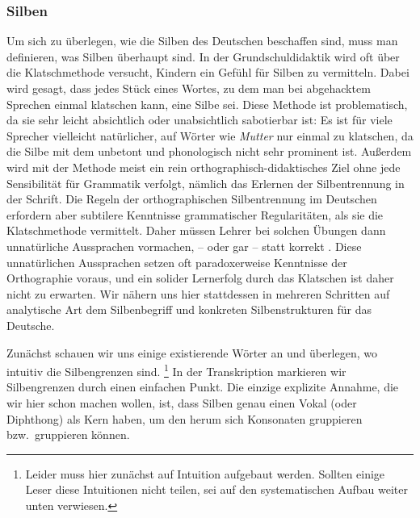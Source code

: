 \label{sec:silben}

\subsubsection{Silben}


Um sich zu überlegen, wie die Silben des Deutschen beschaffen sind, muss man definieren, was Silben überhaupt sind.
In der Grundschuldidaktik wird oft über die Klatschmethode versucht, Kindern ein Gefühl für Silben zu vermitteln.
Dabei wird gesagt, dass jedes Stück eines Wortes, zu dem man bei abgehacktem Sprechen einmal klatschen kann, eine Silbe sei.
Diese Methode ist problematisch, da sie sehr leicht absichtlich oder unabsichtlich sabotierbar ist:
Es ist für viele Sprecher vielleicht natürlicher, auf Wörter wie \textit{Mutter} \textipa{[mUt5]} nur einmal zu klatschen, da die Silbe mit dem \textipa{[5]} unbetont und phonologisch nicht sehr prominent ist.
Außerdem wird mit der Methode meist ein rein orthographisch-didaktisches Ziel ohne jede Sensibilität für Grammatik verfolgt, nämlich das Erlernen der Silbentrennung in der Schrift.
Die Regeln der orthographischen Silbentrennung im Deutschen erfordern aber subtilere Kenntnisse grammatischer Regularitäten, als sie die Klatschmethode vermittelt.
Daher müssen Lehrer bei solchen Übungen dann unnatürliche Aussprachen vormachen, \zB \textipa{[mut]} -- \textipa{[ta]} oder gar \textipa{[mut]} -- \textipa{[tEK]} statt korrekt \textipa{[mUt5]}.
Diese unnatürlichen Aussprachen setzen oft paradoxerweise Kenntnisse der Orthographie voraus, und ein solider Lernerfolg durch das Klatschen ist daher nicht zu erwarten.
Wir nähern uns hier stattdessen in mehreren Schritten auf analytische Art dem Silbenbegriff und konkreten Silbenstrukturen für das Deutsche.

Zunächst schauen wir uns einige existierende Wörter an und überlegen, wo intuitiv die Silbengrenzen sind.%
\footnote{Leider muss hier zunächst auf Intuition aufgebaut werden.
Sollten einige Leser diese Intuitionen nicht teilen, sei auf den systematischen Aufbau weiter unten verwiesen.}
In der Transkription markieren wir Silbengrenzen durch einen einfachen Punkt.
Die einzige explizite Annahme, die wir hier schon machen wollen, ist, dass Silben genau einen Vokal (oder Diphthong) als Kern haben, um den herum sich Konsonaten gruppieren bzw.\ gruppieren können.

\begin{exe}
  \ex\label{ex:phol1830}
  \begin{xlist}
  \end{xlist}
\end{exe}

